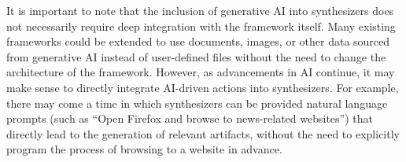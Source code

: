 It is important to note that the inclusion of generative AI into
synthesizers does not necessarily require deep integration with the
framework itself. Many existing frameworks could be extended to use
documents, images, or other data sourced from generative AI instead of
user-defined files without the need to change the architecture of the
framework. However, as advancements in AI continue, it may make sense to
directly integrate AI-driven actions into synthesizers. For example,
there may come a time in which synthesizers can be provided natural
language prompts (such as ``Open Firefox and browse to news-related
websites'') that directly lead to the generation of relevant artifacts,
without the need to explicitly program the process of browsing to a
website in advance.
